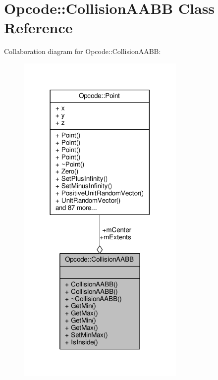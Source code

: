 \hypertarget{classOpcode_1_1CollisionAABB}{}\section{Opcode\+:\+:Collision\+A\+A\+BB Class Reference}
\label{classOpcode_1_1CollisionAABB}


Collaboration diagram for Opcode\+:\+:Collision\+A\+A\+BB\+:
\nopagebreak
\begin{figure}[H]
\begin{center}
\leavevmode
\includegraphics[width=230pt]{d2/d99/classOpcode_1_1CollisionAABB__coll__graph}
\end{center}
\end{figure}
